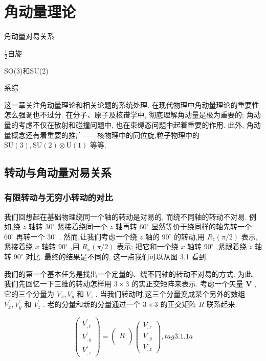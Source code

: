 \ifx\allfiles\undefined



	\else
	\fi
\chapter{角动量理论}
\begin{introduction}
	\item 角动量对易关系
	\item $\frac12$自旋
	\item SO(3)和SU(2)
	\item 系综
\end{introduction}
这一章关注角动量理论和相关论题的系统处理. 在现代物理中角动量理论的重要性怎么强调也不过分. 在分子、原子及核谱学中, 彻底理解角动量是极为重要的; 角动量的考虑不仅在散射和碰撞问题中, 也在束缚态问题中起着重要的作用. 此外, 角动量概念还有着重要的推广——核物理中的同位旋,粒子物理中的 $\mathrm{{SU}}\left( 3\right) ,\mathrm{{SU}}\left( 2\right) \otimes \mathrm{U}\left( 1\right)$ 等等.
\section{转动与角动量对易关系}
\subsection{有限转动与无穷小转动的对比}

我们回想起在基础物理绕同一个轴的转动是对易的, 而绕不同轴的转动不对易. 例如,绕 $z$ 轴转 ${30}^{ \circ }$ 紧接着绕同一个 $z$ 轴再转 ${60}^{ \circ }$ 显然等价于绕同样的轴先转一个 ${60}^{ \circ }$ 再转一个 ${30}^{ \circ }$ . 然而,让我们考虑一个绕 $z$ 轴的 ${90}^{ \circ }$ 的转动,用 ${R}_{z}\left( {\pi /2}\right)$ 表示,紧接着绕 $x$ 轴转 ${90}^{ \circ }$ ,用 ${R}_{x}\left( {\pi /2}\right)$ 表示; 把它和一个绕 $x$ 轴转 ${90}^{ \circ }$ ,紧跟着绕 $z$ 轴转 ${90}^{ \circ }$ 对比. 最终的结果是不同的, 这一点我们可以从图 3.1 看到.

我们的第一个基本任务是找出一个定量的、绕不同轴的转动不对易的方式. 为此, 我们先回忆一下三维的转动怎样用 $3 \times 3$ 的实正交矩阵来表示. 考虑一个矢量 $\mathbf{V}$ ,它的三个分量为 ${V}_{x},{V}_{y}$ 和 ${V}_{z}$ . 当我们转动时,这三个分量变成某个另外的数组 ${V}_{x}^{\prime },{V}_{y}^{\prime }$ 和 ${V}_{z}^{\prime }$ . 老的分量和新的分量通过一个 $3 \times 3$ 的正交矩阵 $R$ 联系起来:

$$
\left( \begin{array}{l} {V}_{, r}^{\prime } \\ {V}_{, y}^{\prime } \\ {V}_{, z}^{\prime } \end{array}\right) = \left( \begin{array}{l} \\ R \\ \\ \end{array}\right) \left( \begin{array}{l} {V}_{, r} \\ {V}_{, y} \\ {V}_{, z} \end{array}\right) , tag{3.1.1a}
$$

